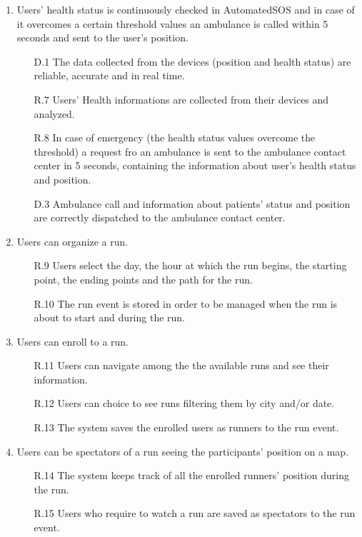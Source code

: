 \documentclass[a4paper]{article}
\begin{document}
\begin{enumerate}[label*=\bf{G.\arabic*}]
\begin{enumerate}[label*=.\arabic*]
    \end{enumerate}
	    
	\item Users' health status is continuously checked in AutomatedSOS and in case of it overcomes a certain threshold values an ambulance is called within 5 seconds and sent to the user's position.

    \begin{enumerate}
        \item [D.1] The data collected from the devices (position and health status) are reliable, accurate and in real time.
        \item [R.7] Users' Health informations are collected from their devices and analyzed.
        \item [R.8] In case of emergency (the health status values overcome the threshold) a request fro an ambulance is sent to the ambulance contact center in 5 seconds, containing the information about user's health status and position.
        \item [D.3] Ambulance call and information about patients' status and position are correctly dispatched to the ambulance contact center.
    \end{enumerate}
	
	\item Users can organize a run.
	
	\begin{enumerate}
        \item [R.9] Users select the day, the hour at which the run begins, the starting point, the ending points and the path for the run.
        \item [R.10] The run event is stored in order to be managed when the run is about to start and during the run.
    \end{enumerate}
	
	\item Users can enroll to a run.
	
	\begin{enumerate}
        \item [R.11] Users can navigate among the the available runs and see their information.
        \item [R.12] Users can choice to see runs filtering them by city and/or date. 
        \item [R.13] The system saves the enrolled users as runners to the run event.
    \end{enumerate}
	
	\item Users can be spectators of a run seeing the participants' position on a map.
	
	\begin{enumerate}
        \item [R.14] The system keeps track of all the enrolled runners' position during the run.
        \item [R.15] Users who require to watch a run are saved as spectators to the run event.
    \end{enumerate}
	
\end{enumerate}
\end{document}
